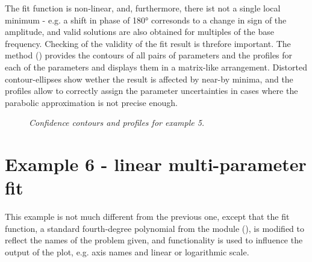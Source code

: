 \documentclass[a4paper,10pt,english]{sphinxmanual}
\begin{document}
The fit function is non-linear, and, furthermore, there ist not a single
local minimum - e.g. a shift in phase of 180° corresonds to a change in
sign of the amplitude, and valid solutions are also obtained for multiples
of the base frequency. Checking of the validity of the fit result is
threfore important. The method
{\hyperref[module_doc:kafe.fit.Fit.plot_correlations]{\emph{}}} () provides the
contours of all pairs of parameters and the profiles for each of
the parameters and displays them in a matrix-like arrangement.
Distorted contour-ellipses show wether the result is affected
by near-by minima, and the profiles allow to correctly assign
the parameter uncertainties in cases where the parabolic
approximation is not precise enough.
\begin{figure}[htbp]
\centering
\capstart

\caption{\emph{Confidence contours and profiles for example 5.}}\end{figure}


\section{Example 6 - linear multi-parameter fit}
\label{examples:example-6-linear-multi-parameter-fit}
This example is not much different from the previous one, except that
the fit function, a standard fourth-degree polynomial from the module
{\hyperref[module_doc:module-function_library]{\emph{}}} (), is modified to reflect the names of the problem
given, and  functionality is used to influence the
output of the plot, e.g. axis names and linear or logarithmic scale.
\end{document}

